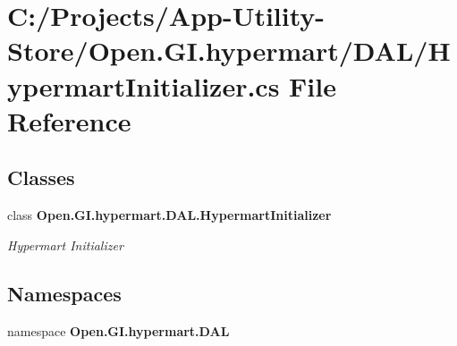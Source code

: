 \section{C\+:/\+Projects/\+App-\/\+Utility-\/\+Store/\+Open.G\+I.\+hypermart/\+D\+A\+L/\+Hypermart\+Initializer.cs File Reference}
\label{_hypermart_initializer_8cs}
\subsection*{Classes}
\begin{DoxyCompactItemize}
\item 
class \textbf{ Open.\+G\+I.\+hypermart.\+D\+A\+L.\+Hypermart\+Initializer}
\begin{DoxyCompactList}\small\item\em Hypermart Initializer \end{DoxyCompactList}\end{DoxyCompactItemize}
\subsection*{Namespaces}
\begin{DoxyCompactItemize}
\item 
namespace \textbf{ Open.\+G\+I.\+hypermart.\+D\+AL}
\end{DoxyCompactItemize}
